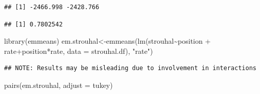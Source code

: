 \documentclass[
]{book}
\newenvironment{Shaded}{\begin{snugshade}}{\end{snugshade}}
\newcommand{\AttributeTok}[1]{\textcolor[rgb]{0.77,0.63,0.00}{#1}}
\newcommand{\DecValTok}[1]{\textcolor[rgb]{0.00,0.00,0.81}{#1}}
\newcommand{\FunctionTok}[1]{\textcolor[rgb]{0.00,0.00,0.00}{#1}}
\newcommand{\NormalTok}[1]{#1}
\newcommand{\OtherTok}[1]{\textcolor[rgb]{0.56,0.35,0.01}{#1}}
\newcommand{\SpecialCharTok}[1]{\textcolor[rgb]{0.00,0.00,0.00}{#1}}
\newcommand{\StringTok}[1]{\textcolor[rgb]{0.31,0.60,0.02}{#1}}
\begin{document}
\begin{verbatim}
## [1] -2466.998 -2428.766
\end{verbatim}

\begin{Shaded}
\end{Shaded}

\begin{verbatim}
## [1] 0.7802542
\end{verbatim}

\begin{Shaded}
\begin{Highlighting}[]
\FunctionTok{library}\NormalTok{(emmeans)}
\NormalTok{em.strouhal}\OtherTok{\textless{}{-}}\FunctionTok{emmeans}\NormalTok{(}\FunctionTok{lm}\NormalTok{(strouhal}\SpecialCharTok{\textasciitilde{}}\NormalTok{position }\SpecialCharTok{+}\NormalTok{ rate}\SpecialCharTok{+}\NormalTok{position}\SpecialCharTok{*}\NormalTok{rate, }\AttributeTok{data =}\NormalTok{ strouhal.df), }\StringTok{"rate"}\NormalTok{)}
\end{Highlighting}
\end{Shaded}

\begin{verbatim}
## NOTE: Results may be misleading due to involvement in interactions
\end{verbatim}

\begin{Shaded}
\begin{Highlighting}[]
\FunctionTok{pairs}\NormalTok{(em.strouhal, }\AttributeTok{adjust =} \StringTok{\textquotesingle{}tukey\textquotesingle{}}\NormalTok{)}
\end{Highlighting}
\end{Shaded}
\end{document}
